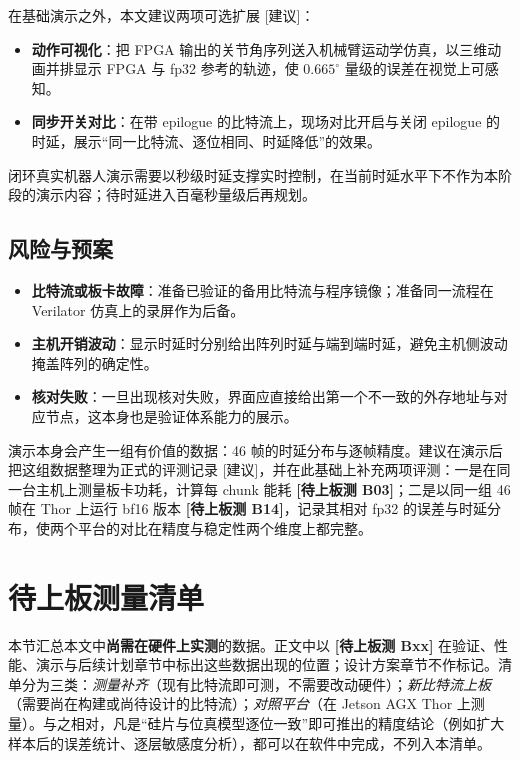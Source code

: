 \documentclass[a4paper,10.5pt]{ctexart}
\newcommand{\tR}{\textsf{[建议]}}           %
\newcommand{\tB}[1]{\textcolor{red!70!black}{\textsf{\textbf{[待上板测 #1]}}}}
\begin{document}
在基础演示之外，本文建议两项可选扩展 \tR：
\begin{itemize}
  \item \textbf{动作可视化}：把 FPGA 输出的关节角序列送入机械臂运动学仿真，以三维动画并排显示 FPGA 与 fp32 参考的轨迹，使 $0.665^\circ$ 量级的误差在视觉上可感知。
  \item \textbf{同步开关对比}：在带 epilogue 的比特流上，现场对比开启与关闭 epilogue 的时延，展示“同一比特流、逐位相同、时延降低”的效果。
\end{itemize}
闭环真实机器人演示需要以秒级时延支撑实时控制，在当前时延水平下不作为本阶段的演示内容；待时延进入百毫秒量级后再规划。

\subsection{风险与预案}

\begin{itemize}
  \item \textbf{比特流或板卡故障}：准备已验证的备用比特流与程序镜像；准备同一流程在 Verilator 仿真上的录屏作为后备。
  \item \textbf{主机开销波动}：显示时延时分别给出阵列时延与端到端时延，避免主机侧波动掩盖阵列的确定性。
  \item \textbf{核对失败}：一旦出现核对失败，界面应直接给出第一个不一致的外存地址与对应节点，这本身也是验证体系能力的展示。
\end{itemize}

演示本身会产生一组有价值的数据：46 帧的时延分布与逐帧精度。建议在演示后把这组数据整理为正式的评测记录 \tR，并在此基础上补充两项评测：一是在同一台主机上测量板卡功耗，计算每 chunk 能耗 \tB{B03}；二是以同一组 46 帧在 Thor 上运行 bf16 版本 \tB{B14}，记录其相对 fp32 的误差与时延分布，使两个平台的对比在精度与稳定性两个维度上都完整。


\section{待上板测量清单}\label{sec:board}


本节汇总本文中\textbf{尚需在硬件上实测}的数据。正文中以 \tB{Bxx} 在验证、性能、演示与后续计划章节中标出这些数据出现的位置；设计方案章节不作标记。清单分为三类：\emph{测量补齐}（现有比特流即可测，不需要改动硬件）；\emph{新比特流上板}（需要尚在构建或尚待设计的比特流）；\emph{对照平台}（在 Jetson AGX Thor 上测量）。与之相对，凡是“硅片与位真模型逐位一致”即可推出的精度结论（例如扩大样本后的误差统计、逐层敏感度分析），都可以在软件中完成，不列入本清单。
\end{document}

